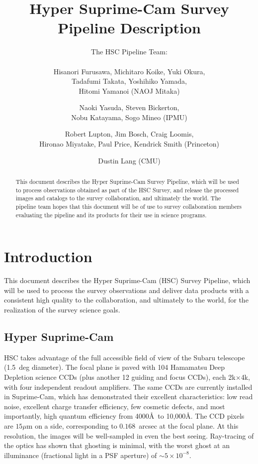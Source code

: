 \documentclass[12pt]{article}
\title{Hyper Suprime-Cam Survey \\
  Pipeline Description}
\author{
  The HSC Pipeline Team: \\ \\
  Hisanori Furusawa,
  Michitaro Koike,
  Yuki Okura, \\
  Tadafumi Takata,
  Yoshihiko Yamada, \\
  Hitomi Yamanoi (NAOJ Mitaka) \and
  Naoki Yasuda,
  Steven Bickerton, \\
  Nobu Katayama,
  Sogo Mineo (IPMU) \and
  Robert Lupton,
  Jim Bosch,
  Craig Loomis, \\
  Hironao Miyatake,
  Paul Price,
  Kendrick Smith (Princeton) \and
  Dustin Lang (CMU) \\
}
\newcommand\x         {\hbox{$\times$}}
\begin{document}
\maketitle
\pagestyle{headings}

\begin{abstract}
This document describes the Hyper Suprime-Cam Survey Pipeline, which
will be used to process observations obtained as part of the HSC Survey,
and release the processed images and catalogs to the survey collaboration, and
ultimately the world.  The pipeline team hopes that this document will
be of use to survey collaboration members evaluating the pipeline and its
products for their use in science programs.
\end{abstract}

\clearpage

\tableofcontents

\clearpage

\section{Introduction}

This document describes the Hyper Suprime-Cam (HSC) Survey Pipeline, which will be used to process the survey
observations and deliver data products with a consistent high quality to the collaboration, and ultimately to
the world, for the realization of the survey science goals.

\subsection{Hyper Suprime-Cam}


HSC takes advantage of the full accessible field of view of the Subaru telescope (1.5~deg diameter).  The
focal plane is paved with 104 Hamamatsu Deep Depletion science CCDs (plus another 12 guiding and focus CCDs),
each 2k\x 4k, with four independent readout amplifiers.  The same CCDs are currently installed
in Suprime-Cam, which has demonstrated their excellent characteristics: low read noise, excellent charge
transfer efficiency, few cosmetic defects, and most importantly, high quantum efficiency from 4000\AA\ to
10,000\AA.  The CCD pixels are $15\mu$m on a side, corresponding to $0.168$~arcsec at the focal plane. At this
resolution, the images will be well-sampled in even the best seeing.  Ray-tracing of the optics has shown that
ghosting is minimal, with the worst ghost at an illuminance (fractional light in a PSF aperture) of $\sim 5
\times 10^{-8}$.
\end{document}
